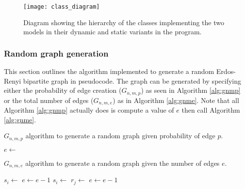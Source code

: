 \begin{figure}
  \centering
  \texttt{[image: class\_diagram]}
  \caption{Diagram showing the hierarchy of the classes implementing the two models in their dynamic and static variants in the \CC{} program.}
  \label{fig:class-diagram}
\end{figure}

\subsubsection{Random graph generation}

This section outlines the algorithm implemented to generate a random Erdos-Renyi bipartite graph \cite{Erdos1960} in pseudocode.
The graph can be generated by specifying either the probability of edge creation ($G_{n,m,p}$) as seen in Algorithm \ref{alg:gnmp} or the total number of edges ($G_{n,m,e}$) as in Algorithm \ref{alg:gnme}.
Note that all Algorithm \ref{alg:gnmp} actually does is compute a value of $e$ then call Algorithm \ref{alg:gnme}.


\begin{algorithm}
  \caption{$G_{n,m,p}$ algorithm to generate a random \nbym{} graph given probability of edge $p$.} \label{alg:gnmp}
\begin{algorithmic}[1]
    \State $e \gets$ 
    \State \Return {}
  \EndProcedure
\end{algorithmic}
\end{algorithm}

\begin{algorithm}
  \caption{$G_{n,m,e}$ algorithm to generate a random \nbym{} graph given the number of edges $e$.} \label{alg:gnme}
  \begin{algorithmic}[1]
          \State $s_i \gets$ 
          \State {}
          \State $e \gets e - 1$
        \EndFor
      \EndIf
        \State $s_i \gets$ 
        \State $r_j \gets$ 
        \State {}
        \State $e \gets e - 1$
      \EndWhile
    \EndProcedure  
  \end{algorithmic}
\end{algorithm}

